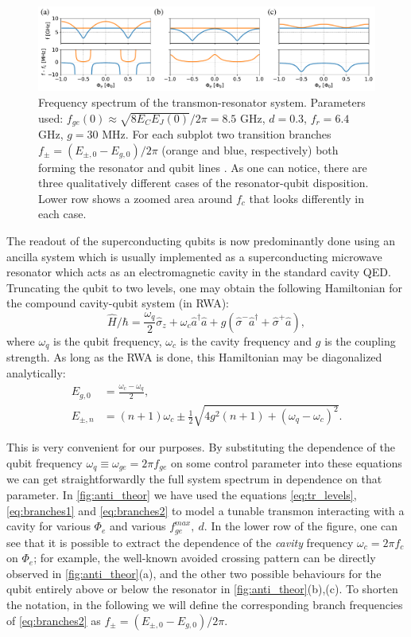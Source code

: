 \documentclass[%
 aip,
 amsmath,amssymb,
 reprint,%
]{revtex4-1}
\begin{document}
\begin{figure}
\centering
\includegraphics[width=\textwidth]{anti_theor}
\caption{Frequency spectrum of the transmon-resonator system. Parameters used: $f_{ge}(0) \approx \sqrt{8E_C E_J(0)}/2\pi = 8.5$ GHz, $d=0.3$, $f_r=6.4$ GHz, $g = 30$ MHz. For each subplot two transition branches $f_{\pm} = (E_{\pm,0} - E_{g,0})/2\pi$ (orange and blue, respectively) both forming the resonator and qubit lines . As one can notice, there are three qualitatively different cases of the resonator-qubit disposition. Lower row shows a zoomed area around $f_c$ that looks differently in each case.}
\label{fig:anti_theor}
\end{figure}

The readout of the superconducting qubits is now predominantly done using an ancilla system which is usually implemented as a superconducting microwave resonator which acts as an electromagnetic cavity in the standard cavity QED. Truncating the qubit to two levels, one may obtain the following Hamiltonian for the compound cavity-qubit system (in RWA):
\begin{equation}
\hat H/\hbar = \frac{\omega_q}{2} \hat \sigma_z + \omega_c \hat a^\dagger \hat a + g(\hat \sigma^- \hat a^\dagger + \hat \sigma^+ \hat a),
\end{equation}
where $\omega_q$ is the qubit frequency, $\omega_c$ is the cavity frequency and $g$ is the coupling strength. As long as the RWA is done, this Hamiltonian may be diagonalized analytically:
\begin{align}
E_{g, 0} &= \frac{\omega_c - \omega_q}{2},\label{eq:branches1}
 \\
E_{\pm, n} &= (n+1)\omega_c \pm \frac{1}{2}\sqrt{4g^2(n+1)+(\omega_q-\omega_c)^2}.
\label{eq:branches2}
\end{align}

This is very convenient for our purposes. By substituting the dependence of the qubit frequency $\omega_q \equiv \omega_{ge} = 2\pi f_{ge}$ on some control parameter into these equations we can get straightforwardly the full system spectrum in dependence on that parameter. In \autoref{fig:anti_theor} we have used the equations \eqref{eq:tr_levels}, \eqref{eq:branches1} and \eqref{eq:branches2} to model a tunable transmon interacting with a cavity for various $\Phi_e$ and various $f_{ge}^{max},\ d$. In the lower row of the figure, one can see that it is possible to extract the dependence of the \textit{cavity} frequency $\omega_c = 2\pi f_c$ on $\Phi_e$; for example, the well-known avoided crossing pattern can be directly observed in \autoref{fig:anti_theor}(a), and the other two possible behaviours for the qubit entirely above or below the resonator in \autoref{fig:anti_theor}(b),(c). To shorten the notation, in the following we will define the corresponding branch frequencies of \eqref{eq:branches2} as $f_{\pm} = ( E_{\pm,0}-E_{g,0})/2\pi$.
\end{document}
